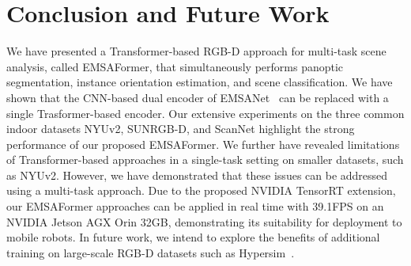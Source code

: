 \documentclass[conference]{IEEEtran}
\begin{document}
 \section{Conclusion and Future Work}
\label{sec:conclusion}
We have presented a Transformer-based RGB-D approach for multi-task scene analysis, called EMSAFormer, that simultaneously performs panoptic segmentation, instance orientation estimation, and scene classification.
We have shown that the CNN-based dual encoder of EMSANet~\cite{emsanet2022ijcnn} can be replaced with a single Trasformer-based encoder.
Our extensive experiments on the three common indoor datasets NYUv2, SUNRGB-D, and ScanNet highlight the strong performance of our proposed EMSAFormer.
We further have revealed limitations of Transformer-based approaches in a single-task setting on smaller datasets, such as NYUv2.
However, we have demonstrated that these issues can be addressed using a multi-task approach.
Due to the proposed NVIDIA TensorRT extension, our EMSAFormer approaches can be applied in real time with 39.1FPS on an NVIDIA Jetson AGX Orin 32GB, demonstrating its suitability for deployment to mobile robots.
In future work, we intend to explore the benefits of additional training on large-scale RGB-D datasets such as Hypersim~\cite{hypersim-iccv2021}.
\end{document}
